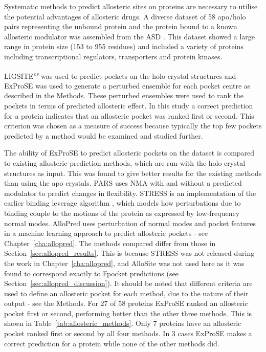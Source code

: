 Systematic methods to predict allosteric sites on proteins are necessary to utilise the potential advantages of allosteric drugs.
A diverse dataset of 58 apo/holo pairs representing the unbound protein and the protein bound to a known allosteric modulator was assembled from the ASD \cite{Shen2016}.
This dataset showed a large range in protein size (153 to 955 residues) and included a variety of proteins including transcriptional regulators, transporters and protein kinases.

LIGSITE\textsuperscript{\it cs} was used to predict pockets on the holo crystal structures and ExProSE was used to generate a perturbed ensemble for each pocket centre as described in the Methods.
These perturbed ensembles were used to rank the pockets in terms of predicted allosteric effect.
In this study a correct prediction for a protein indicates that an allosteric pocket was ranked first or second.
This criterion was chosen as a measure of success because typically the top few pockets predicted by a method would be examined and studied further.

The ability of ExProSE to predict allosteric pockets on the dataset is compared to existing allosteric prediction methods, which are run with the holo crystal structures as input.
This was found to give better results for the existing methods than using the apo crystals.
PARS \cite{Panjkovich2014} uses NMA with and without a predicted modulator to predict changes in flexibility.
STRESS \cite{Clarke2016} is an implementation of the earlier binding leverage algorithm \cite{Mitternacht2011}, which models how perturbations due to binding couple to the motions of the protein as expressed by low-frequency normal modes.
AlloPred \cite{Greener2015} uses perturbation of normal modes and pocket features in a machine learning approach to predict allosteric pockets - see Chapter~\ref{cha:allopred}.
The methods compared differ from those in Section~\ref{sec:allopred_results}.
This is because STRESS was not released during the work in Chapter~\ref{cha:allopred}, and AlloSite was not used here as it was found to correspond exactly to Fpocket predictions (see Section~\ref{sec:allopred_discussion}).
It should be noted that different criteria are used to define an allosteric pocket for each method, due to the nature of their output - see the Methods.
For 27 of 58 proteins ExProSE ranked an allosteric pocket first or second, performing better than the other three methods.
This is shown in Table~\ref{tab:allosteric_methods}.
Only 7 proteins have an allosteric pocket ranked first or second by all four methods.
In 3 cases ExProSE makes a correct prediction for a protein while none of the other methods did.

